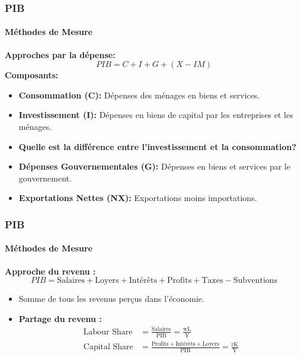 \documentclass{beamer}
\begin{document}
\begin{frame}
    \frametitle{PIB}
    \framesubtitle{Méthodes de Mesure}
        \textbf{Approches par la dépense:}
        \begin{equation}
            PIB = C + I + G + (X - IM)
        \end{equation}
        \textbf{Composants:}
        \begin{itemize}
            \item \textbf{Consommation (C):} 
            Dépenses des ménages en biens et services.
            \item \textbf{Investissement (I):}  
            Dépenses en biens de capital par les entreprises et les ménages.
            \pause
            \item 
            \textbf{Quelle est la différence entre l'investissement et la consommation?}
            \pause
            \item \textbf{Dépenses Gouvernementales (G):}  
            Dépenses en biens et services par le gouvernement.
            \item \textbf{Exportations Nettes (NX):} 
            Exportations moins importations.
        \end{itemize}
\end{frame}

\begin{frame}
    \frametitle{PIB}  
        \framesubtitle{Méthodes de Mesure}
        \textbf{Approche du revenu :}
        \begin{equation}
            PIB = \text{Salaires} + \text{Loyers} + \text{Intérêts} + \text{Profits} + \text{Taxes} - \text{Subventions}
        \end{equation}

        \begin{itemize}
            \item Somme de tous les revenus perçus dans l'économie.
            \item \textbf{Partage du revenu :}
            \begin{align}
                \text{Labour Share} &= \frac{\text{Salaires}}{\text{PIB}} =
                \frac{\text{wL}}{\text{Y}} \\
                \text{Capital Share} &= \frac{\text{Profits} + \text{Intérêts} + \text{Loyers}}{\text{PIB}}
                = \frac{\text{rK}}{\text{Y}}
            \end{align}
        \end{itemize}
\end{frame}
\end{document}
